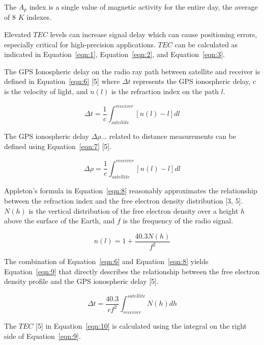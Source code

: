 \documentclass[sn-mathphys-num]{sn-jnl}%
\begin{document}
The $A_p$ index is a single value of magnetic activity for the entire day, the average of $8$ $K$ indexes. 
 
Elevated $TEC$ levels can increase signal delay which can cause positioning errors, especially critical for high-precision applications. $TEC$ can be calculated as indicated in Equation~\ref{eqn:1}, Equation~\ref{eqn:2}, and Equation~\ref{eqn:3}. 

The GPS Ionospheric delay on the radio ray path between satellite and receiver is defined in Equation~\ref{eqn:6} [5] where $\Delta t$ represents the GPS ionospheric delay, $c$ is the velocity of light, and $n(l)$ is the refraction index on the path $l$.

\begin{equation}
	\Delta t = \frac{1}{c} \int_{satellite}^{receiver} \left[ n(l) - l \right]dl
	\label{eqn:6}
\end{equation}

The GPS ionospheric delay $\Delta \rho \dots$ related to distance measurements can be defined using Equation~\ref{eqn:7} [5].

\begin{equation}
	\Delta \rho = \frac{1}{c} \int_{satellite}^{receiver} \left[ n(l) - l \right]dl
	\label{eqn:7}
\end{equation}

Appleton’s formula in Equation~\ref{eqn:8} reasonably approximates the relationship between the refraction index and the free electron density distribution [3, 5]. $N(h)$ is the vertical distribution of the free electron density over a height $h$ above the surface of the Earth, and $f$ is the frequency of the radio signal.

\begin{equation}
	n(l) = 1 + \frac{40.3 N(h)}{f^{2}}
	\label{eqn:8}
\end{equation}

The combination of Equation~\ref{eqn:6} and Equation~\ref{eqn:8} yields Equation~\ref{eqn:9} that directly describes the relationship between the free electron density profile and the GPS ionospheric delay [5].

\begin{equation}
	\Delta t = \frac{40.3}{c f^{2}} \int_{receiver}^{satellite} N(h)dh
	\label{eqn:9}
\end{equation}

The $TEC$ [5] in Equation~\ref{eqn:10} is calculated using the integral on the right side of Equation~\ref{eqn:9}.
\end{document}
